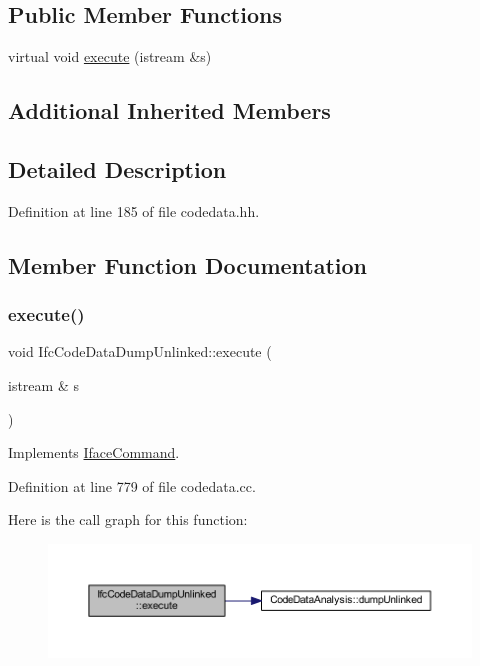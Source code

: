 \subsection*{Public Member Functions}
\begin{DoxyCompactItemize}
\item 
virtual void \mbox{\hyperlink{class_ifc_code_data_dump_unlinked_a9ac1562f496cfd10470f1a52fc97d872}{execute}} (istream \&s)
\end{DoxyCompactItemize}
\subsection*{Additional Inherited Members}


\subsection{Detailed Description}


Definition at line 185 of file codedata.\+hh.



\subsection{Member Function Documentation}
\mbox{\label{class_ifc_code_data_dump_unlinked_a9ac1562f496cfd10470f1a52fc97d872}} 
\subsubsection{\texorpdfstring{execute()}{execute()}}
{\footnotesize\ttfamily void Ifc\+Code\+Data\+Dump\+Unlinked\+::execute (\begin{DoxyParamCaption}\item[{istream \&}]{s }\end{DoxyParamCaption})\hspace{0.3cm}{\ttfamily [virtual]}}



Implements \mbox{\hyperlink{class_iface_command_af10e29cee2c8e419de6efe9e680ad201}{Iface\+Command}}.



Definition at line 779 of file codedata.\+cc.

Here is the call graph for this function\+:
\nopagebreak
\begin{figure}[H]
\begin{center}
\leavevmode
\includegraphics[width=350pt]{class_ifc_code_data_dump_unlinked_a9ac1562f496cfd10470f1a52fc97d872_cgraph}
\end{center}
\end{figure}


